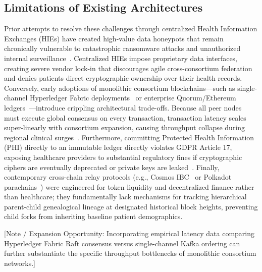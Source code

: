 \subsection{Limitations of Existing Architectures}
Prior attempts to resolve these challenges through centralized Health Information Exchanges (HIEs) have created high-value data honeypots that remain chronically vulnerable to catastrophic ransomware attacks and unauthorized internal surveillance~\cite{sharma2020security}. Centralized HIEs impose proprietary data interfaces, creating severe vendor lock-in that discourages agile cross-consortium federation and denies patients direct cryptographic ownership over their health records. Conversely, early adoptions of monolithic consortium blockchains—such as single-channel Hyperledger Fabric deployments~\cite{androulaki2018hyperledger} or enterprise Quorum/Ethereum ledgers~\cite{wood2014ethereum, ekblaw2016medrec}—introduce crippling architectural trade-offs. Because all peer nodes must execute global consensus on every transaction, transaction latency scales super-linearly with consortium expansion, causing throughput collapse during regional clinical surges~\cite{gordon2018blockchain}. Furthermore, committing Protected Health Information (PHI) directly to an immutable ledger directly violates GDPR Article 17, exposing healthcare providers to substantial regulatory fines if cryptographic ciphers are eventually deprecated or private keys are leaked~\cite{politou2018forgetting, finck2018blockchain}. Finally, contemporary cross-chain relay protocols (e.g., Cosmos IBC~\cite{kwon2019cosmos} or Polkadot parachains~\cite{wood2016polkadot}) were engineered for token liquidity and decentralized finance rather than healthcare; they fundamentally lack mechanisms for tracking hierarchical parent-child genealogical lineage at designated historical block heights, preventing child forks from inheriting baseline patient demographics.

[Note / Expansion Opportunity: Incorporating empirical latency data comparing Hyperledger Fabric Raft consensus versus single-channel Kafka ordering can further substantiate the specific throughput bottlenecks of monolithic consortium networks.]

\IEEEpubidadjcol

